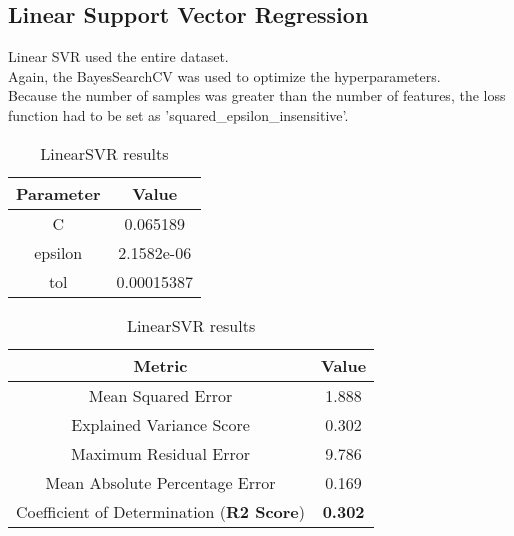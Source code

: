 \documentclass[times, utf8, zavrsni, english]{fer}
\begin{document}
\subsection{Linear Support Vector Regression}
Linear SVR used the entire dataset. \\
Again, the BayesSearchCV was used to optimize the hyperparameters.\\
Because the number of samples was greater than the number of features, the loss function had to be set as 'squared\_epsilon\_insensitive'.
\begin{table}[h!]
	\parbox{.45\linewidth}{
		\centering
		\begin{tabular}{|| c | c ||} 
			\hline
			Parameter & Value \\ [0.5ex] 
			\hline\hline
			C & 0.065189  \\ \hline
			epsilon & 2.1582e-06 \\ \hline
			tol & 0.00015387  \\ 
			\hline
		\end{tabular}
		\caption{Hyperparameteres for LinearSVR}
		\label{table:5}
	}
	\parbox{.45\linewidth}{
		\centering
		\begin{tabular}{|| c | c ||} 
			\hline
			Metric & Value \\ [0.5ex] 
			\hline\hline
			Mean Squared Error & 1.888  \\ \hline
			Explained Variance Score & 0.302\\ \hline
			Maximum Residual Error & 9.786 \\ \hline
			Mean Absolute Percentage Error & 0.169 \\ \hline
			Coefficient of Determination (\textbf{R2 Score}) & \textbf{0.302} \\
			\hline
		\end{tabular}
		\caption{LinearSVR results}
		\label{table:6}
	}
\end{table}
\end{document}
